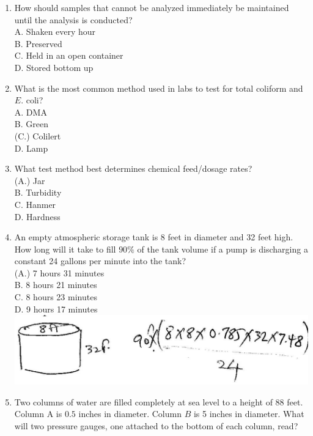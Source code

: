\documentclass[10pt]{article}
\begin{document}
\begin{enumerate}
  \item How should samples that cannot be analyzed immediately be maintained until the analysis is conducted?\\
A. Shaken every hour\\
B. Preserved\\
C. Held in an open container\\
D. Stored bottom up

  \item What is the most common method used in labs to test for total coliform and $E$. coli?\\
A. DMA\\
B. Green\\
(C.) Colilert\\
D. Lamp

  \item What test method best determines chemical feed/dosage rates?\\
(A.) Jar\\
B. Turbidity\\
C. Hanmer\\
D. Hardness

  \item An empty atmospheric storage tank is 8 feet in diameter and 32 feet high. How long will it take to fill $90 \%$ of the tank volume if a pump is discharging a constant 24 gallons per minute into the tank?\\
(A.) 7 hours 31 minutes\\
B. 8 hours 21 minutes\\
C. 8 hours 23 minutes\\
D. 9 hours 17 minutes\\

\includegraphics[max width=\textwidth]{2022_11_11_6852287475e47d0e3aceg-07}

  \item Two columns of water are filled completely at sea level to a height of 88 feet. Column A is $0.5$ inches in diameter. Column $B$ is 5 inches in diameter. What will two pressure gauges, one attached to the bottom of each column, read?

\end{enumerate}
\end{document}
